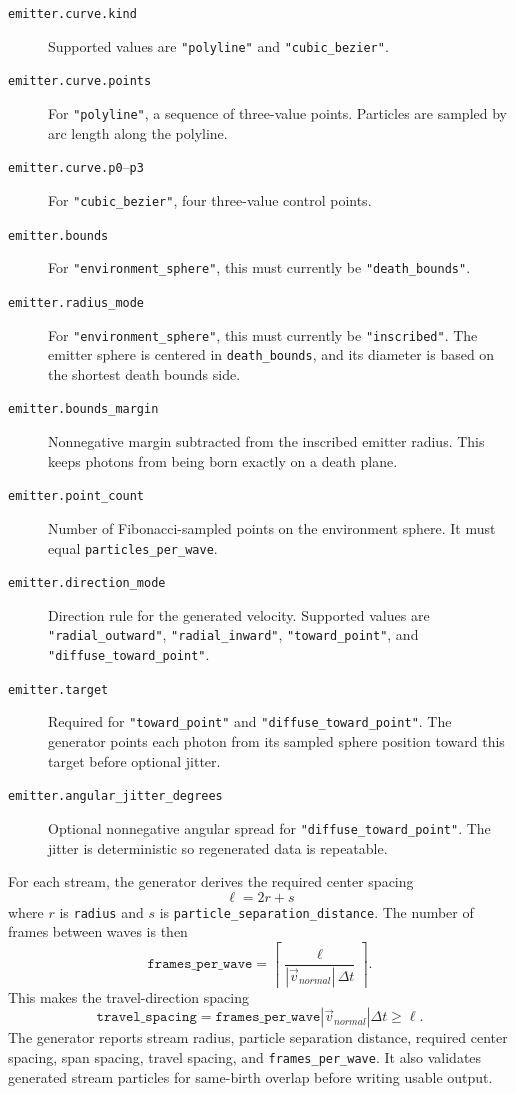 \begin{description}
    \item[\texttt{emitter.curve.kind}] Supported values are
    \texttt{"polyline"} and \texttt{"cubic\_bezier"}.
    \item[\texttt{emitter.curve.points}] For \texttt{"polyline"}, a sequence
    of three-value points.  Particles are sampled by arc length along the
    polyline.
    \item[\texttt{emitter.curve.p0}--\texttt{p3}] For
    \texttt{"cubic\_bezier"}, four three-value control points.
    \item[\texttt{emitter.bounds}] For \texttt{"environment\_sphere"}, this
    must currently be \texttt{"death\_bounds"}.
    \item[\texttt{emitter.radius\_mode}] For
    \texttt{"environment\_sphere"}, this must currently be
    \texttt{"inscribed"}.  The emitter sphere is centered in
    \texttt{death\_bounds}, and its diameter is based on the shortest death
    bounds side.
    \item[\texttt{emitter.bounds\_margin}] Nonnegative margin subtracted from
    the inscribed emitter radius.  This keeps photons from being born exactly
    on a death plane.
    \item[\texttt{emitter.point\_count}] Number of Fibonacci-sampled points
    on the environment sphere.  It must equal
    \texttt{particles\_per\_wave}.
    \item[\texttt{emitter.direction\_mode}] Direction rule for the generated
    velocity.  Supported values are \texttt{"radial\_outward"},
    \texttt{"radial\_inward"}, \texttt{"toward\_point"}, and
    \texttt{"diffuse\_toward\_point"}.
    \item[\texttt{emitter.target}] Required for \texttt{"toward\_point"} and
    \texttt{"diffuse\_toward\_point"}.  The generator points each photon from
    its sampled sphere position toward this target before optional jitter.
    \item[\texttt{emitter.angular\_jitter\_degrees}] Optional nonnegative
    angular spread for \texttt{"diffuse\_toward\_point"}.  The jitter is
    deterministic so regenerated data is repeatable.
\end{description}

For each stream, the generator derives the required center spacing
\[
    \ell = 2r + s
\]
where \(r\) is \texttt{radius} and \(s\) is
\texttt{particle\_separation\_distance}.  The number of frames between waves
is then
\[
    \texttt{frames\_per\_wave}
    =
    \left\lceil
      \frac{\ell}{|\vec{v}_{normal}|\,\Delta t}
    \right\rceil .
\]
This makes the travel-direction spacing
\[
    \texttt{travel\_spacing}
    =
    \texttt{frames\_per\_wave}
    |\vec{v}_{normal}|\Delta t
    \geq \ell .
\]
The generator reports stream radius, particle separation distance, required
center spacing, span spacing, travel spacing, and
\texttt{frames\_per\_wave}.  It also validates generated stream particles for
same-birth overlap before writing usable output.

